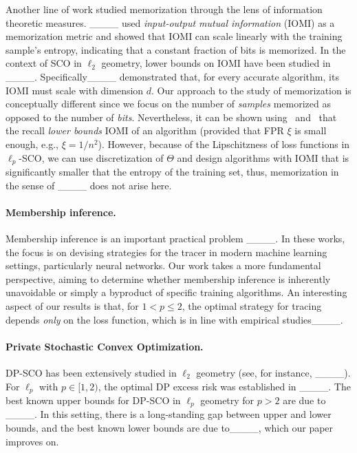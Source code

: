 Another line of work studied memorization through the lens of information theoretic measures. ____ used \emph{input-output mutual information} (IOMI) as a memorization metric and showed that IOMI can scale linearly with the training sample's entropy, indicating that a constant fraction of bits is memorized. 
In the context of SCO in $\ell_2$ geometry, lower bounds on IOMI have been studied in ____. Specifically____ demonstrated that, for every accurate algorithm, its IOMI must scale with dimension $d$. Our approach to the study of memorization is conceptually different since we focus on the number of \emph{samples} memorized as opposed to the number of \emph{bits}. 
Nevertheless, it can be shown using~ and~\cite[Thm.~2.1]{haghifam2020sharpened} that the recall \emph{lower bounds} IOMI of an algorithm (provided that FPR $\xi$ is small enough, e.g., $\xi = 1/n^2$). However, because of the Lipschitzness of loss functions in $\ell_p$-SCO, we can use discretization of $\Theta$ and design algorithms with IOMI that is significantly smaller that the entropy of the training set, thus, memorization in the sense of ____ does not arise here. 

\paragraph{Membership inference.} Membership inference is an important practical problem ____. In these works, the focus is on devising strategies for the tracer in modern machine learning settings, particularly neural networks. Our work takes a more fundamental perspective, aiming to determine whether membership inference is inherently unavoidable or simply a byproduct of specific training algorithms. An interesting aspect of our results is that, for $1 < p \le 2$, the optimal strategy for tracing depends \emph{only} on the loss function, which is in line with empirical studies____. 



\paragraph{Private Stochastic Convex Optimization.}
DP-SCO has been extensively studied in $\ell_2$ geometry (see, for instance, ____). For $\ell_p$ with $p \in [1,2)$, the optimal DP excess risk was established in ____. The best known upper bounds for DP-SCO in $\ell_p$ geometry for $p>2$ are due to ____. In this setting, there is a long-standing gap between upper and lower bounds, and the best known lower bounds are due to____, which our paper improves on.  

